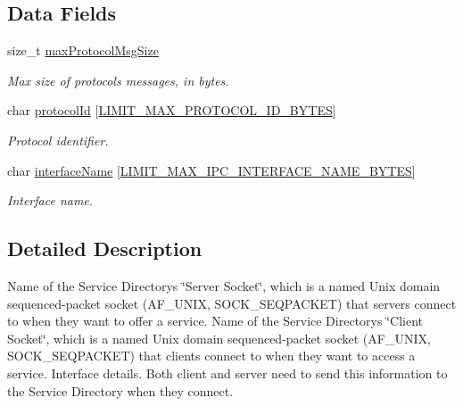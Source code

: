 \subsection*{Data Fields}
\begin{DoxyCompactItemize}
\item 
size\+\_\+t \hyperlink{structsvcdir___interface_details__t_ab309ca94952b674c82a197c1d9ebfb65}{max\+Protocol\+Msg\+Size}
\begin{DoxyCompactList}\small\item\em Max size of protocol\textquotesingle{}s messages, in bytes. \end{DoxyCompactList}\item 
char \hyperlink{structsvcdir___interface_details__t_a7b29992a4baa1652b45d2eee1f70c25f}{protocol\+Id} \mbox{[}\hyperlink{limit_8h_ab51f3f9c6e3da08206cfd964b48d3e60}{L\+I\+M\+I\+T\+\_\+\+M\+A\+X\+\_\+\+P\+R\+O\+T\+O\+C\+O\+L\+\_\+\+I\+D\+\_\+\+B\+Y\+T\+ES}\mbox{]}
\begin{DoxyCompactList}\small\item\em Protocol identifier. \end{DoxyCompactList}\item 
char \hyperlink{structsvcdir___interface_details__t_a77f5893ba98bc6c857515f3bbf1d5864}{interface\+Name} \mbox{[}\hyperlink{limit_8h_a06cfcaef1596f177e04ea0a131257c01}{L\+I\+M\+I\+T\+\_\+\+M\+A\+X\+\_\+\+I\+P\+C\+\_\+\+I\+N\+T\+E\+R\+F\+A\+C\+E\+\_\+\+N\+A\+M\+E\+\_\+\+B\+Y\+T\+ES}\mbox{]}
\begin{DoxyCompactList}\small\item\em Interface name. \end{DoxyCompactList}\end{DoxyCompactItemize}


\subsection{Detailed Description}
Name of the Service Directory\textquotesingle{}s \char`\"{}\+Server Socket\char`\"{}, which is a named Unix domain sequenced-\/packet socket (A\+F\+\_\+\+U\+N\+IX, S\+O\+C\+K\+\_\+\+S\+E\+Q\+P\+A\+C\+K\+ET) that servers connect to when they want to offer a service. Name of the Service Directory\textquotesingle{}s \char`\"{}\+Client Socket\char`\"{}, which is a named Unix domain sequenced-\/packet socket (A\+F\+\_\+\+U\+N\+IX, S\+O\+C\+K\+\_\+\+S\+E\+Q\+P\+A\+C\+K\+ET) that clients connect to when they want to access a service. Interface details. Both client and server need to send this information to the Service Directory when they connect. 

